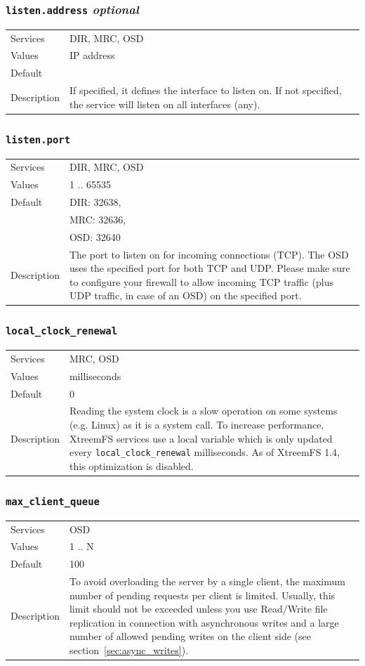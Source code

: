 \documentclass[a4paper,10pt]{book}
\begin{document}
\subsubsection{\texttt{listen.address} \textit{optional}}
\begin{tabular}{lp{10cm}}
 Services & DIR, MRC, OSD\\
 Values   & IP address \\
 Default  & \\
 Description & If specified, it defines the interface to listen on. If not specified, the service will listen on all interfaces (any).
\end{tabular}

\subsubsection{\texttt{listen.port}}
\begin{tabular}{lp{10cm}}
 Services & DIR, MRC, OSD\\
 Values   & 1 .. 65535 \\
 Default  & DIR: 32638,\\
 & MRC: 32636,\\
 & OSD: 32640 \\
 Description & The port to listen on for incoming connections (TCP). The OSD uses the specified port for both TCP and UDP. Please make sure to configure your firewall to allow incoming TCP traffic (plus UDP traffic, in case of an OSD) on the specified port.
\end{tabular}

\subsubsection{\texttt{local\_clock\_renewal}}
\begin{tabular}{lp{10cm}}
 Services & MRC, OSD\\
 Values   & milliseconds \\
 Default  & 0\\
 Description & Reading the system clock is a slow operation on some systems (e.g. Linux) as it is a system call. To increase performance, XtreemFS services use a local variable which is only updated every \texttt{local\_clock\_renewal} milliseconds. As of XtreemFS 1.4, this optimization is disabled.
\end{tabular}

\subsubsection{\texttt{max\_client\_queue}}
\begin{tabular}{lp{10cm}}
 Services & OSD\\
 Values   & 1 .. N\\
 Default  & 100\\
 Description & To avoid overloading the server by a single client, the maximum number of pending requests per client is limited. Usually, this limit should not be exceeded unless you use Read/Write file replication in connection with asynchronous writes and a large number of allowed pending writes on the client side (see section~\ref{sec:async_writes}).
\end{tabular}
\end{document}
